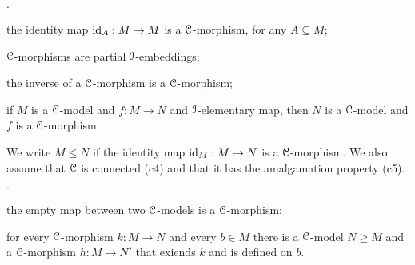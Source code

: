 \documentclass[10pt,oneside]{amsproc}
\newcommand{\mylabel}[1]{{#1}\hfill}
\renewenvironment{itemize}
  {\begin{list}{$\cdot$}{%
  \setlength{\parskip}{0mm}
  \setlength{\topsep}{.4\baselineskip}
  \setlength{\rightmargin}{0mm}
  \setlength{\listparindent}{0mm}
  \setlength{\itemindent}{0mm}
  \setlength{\labelwidth}{3ex}
  \setlength{\itemsep}{.2\baselineskip}
  \setlength{\parsep}{.2\baselineskip}
  \setlength{\partopsep}{0mm}
  \setlength{\labelsep}{1ex}
  \setlength{\leftmargin}{\labelwidth+\labelsep}
  \let\makelabel\mylabel}}{%
\end{list}}
\begin{document}
\begin{itemize} 
  \item[c1.] the identity map ${\rm id}_A:M\to M$ is a ${\EuScript C}$-morphism, for any $A\subseteq M$;
  \item[c2.]  ${\EuScript C}$-morphisms are partial ${\EuScript I}$-embeddings;
  \item[c3.]  the inverse of a ${\EuScript C}$-morphism is a  ${\EuScript C}$-morphism;
  \item[c3.] if $M$ is a ${\EuScript C}$-model and $f:M\to N$ and  ${\EuScript I}$-elementary map, then $N$ is a ${\EuScript C}$-model and $f$ is a  ${\EuScript C}$-morphism.
\end{itemize}

We write $M\le N$ if the identity map ${\rm id}_M:M\to N$ is a ${\EuScript C}$-morphism.
We also assume that ${\EuScript C}$ is connected (c4) and that it has the amalgamation property (c5).

\begin{itemize} 
  \item[c4.] the empty map between two ${\EuScript C}$-models is a ${\EuScript C}$-morphism;
  \item[c5.] for every ${\EuScript C}$-morphism $k:M\to N$ and every $b\in M$ there is a ${\EuScript C}$-model $N\ge M$ and a ${\EuScript C}$-morphism $h:M\to N'$ that exiends $k$ and is defined on $b$.
\end{itemize}
\end{document}
